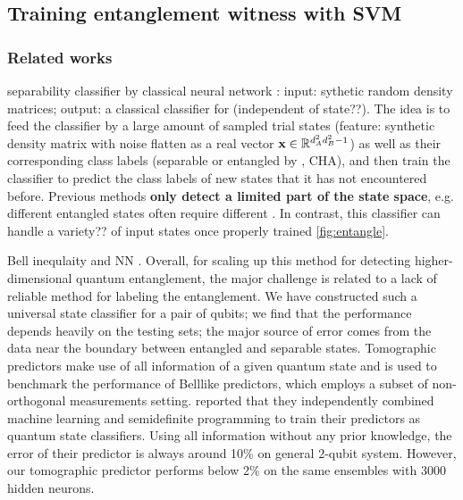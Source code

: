 \documentclass[
10pt,
aps,
pra,
linenumbers,
floatfix,
]{revtex4-2}
\theoremstyle{plain}
\theoremstyle{definition}
\begin{document}
\subsection{Training entanglement witness with SVM}

\subsubsection{Related works}
separability classifier by classical neural network \cite{luSeparabilityEntanglementClassifierMachine2018}:
input: sythetic random density matrices;
output: a classical classifier for  (independent of state??).
The idea is to feed the classifier by a large amount of sampled trial states (feature: synthetic density matrix with noise flatten as a real vector $\vb{x}\in\mathbb{R}^{d_A^2d_B^2-1}$) as well as their corresponding class labels (separable or entangled by , CHA), and then train the classifier to predict the class labels of new states that it has not encountered before.
Previous methods \textbf{only detect a limited part of the state space}, e.g. different entangled states often require different . In contrast, this classifier can handle a variety?? of input states once properly trained \cref{fig:entangle}.

Bell inequlaity and NN \cite{maTransformingBellInequalities2018}. 
Overall, for scaling up this method for detecting higher-dimensional quantum entanglement, the major challenge is related to a lack of reliable method for labeling the entanglement.
We have constructed such a universal state classiﬁer for a pair of qubits; we ﬁnd that the performance depends heavily on the testing sets; the major source of error comes from the data near the boundary between entangled and separable states.
Tomographic predictors make use of all information of a given quantum state and is used to benchmark the performance of Belllike predictors, which employs a subset of non-orthogonal measurements setting.
\cite{luSeparabilityEntanglementClassifierMachine2018} reported that they independently combined machine learning and semideﬁnite programming to train their predictors as quantum state classiﬁers. Using all information without any prior knowledge, the error of their predictor is always around 10\% on general 2-qubit system. However, our tomographic predictor performs below 2\% on the same ensembles with 3000 hidden neurons.
\end{document}
